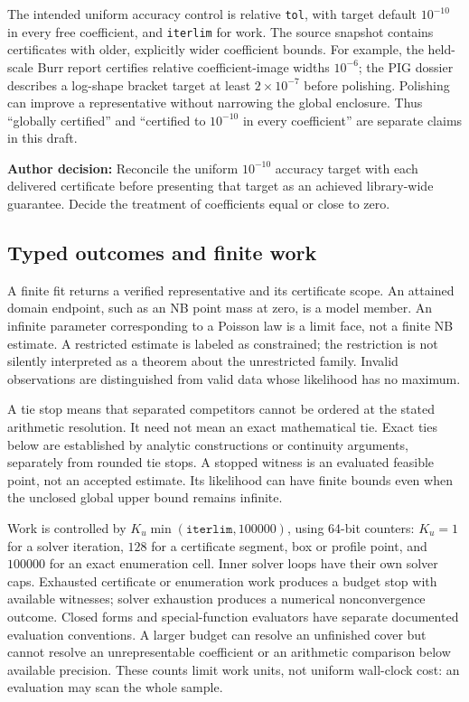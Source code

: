 \documentclass[12pt]{article}
\theoremstyle{definition}
\theoremstyle{remark}
\newcommand{\todo}[1]{\par\smallskip\noindent\textcolor{red!65!black}{\textbf{Author decision:} #1}\par\smallskip}
\newcommand{\code}[1]{\nolinkurl{#1}}
\begin{document}
The intended uniform accuracy control is relative \code{tol}, with target
default $10^{-10}$ in every free coefficient, and \code{iterlim} for work.
The source snapshot contains certificates with older, explicitly wider
coefficient bounds. For example, the held-scale Burr report certifies relative
coefficient-image widths $10^{-6}$; the PIG dossier describes a log-shape
bracket target at least $2\times10^{-7}$ before polishing. Polishing can
improve a representative without narrowing the global enclosure. Thus
``globally certified'' and ``certified to $10^{-10}$ in every coefficient''
are separate claims in this draft.
\todo{Reconcile the uniform $10^{-10}$ accuracy target with each delivered certificate before presenting that target as an achieved library-wide guarantee. Decide the treatment of coefficients equal or close to zero.}

\subsection{Typed outcomes and finite work}
A finite fit returns a verified representative and its certificate scope.
An attained domain endpoint, such as an NB point mass at zero, is a model
member. An infinite parameter corresponding to a Poisson law is a limit face,
not a finite NB estimate. A restricted estimate is labeled as constrained;
the restriction is not silently interpreted as a theorem about the
unrestricted family. Invalid observations are distinguished from valid data
whose likelihood has no maximum.

A tie stop means that separated competitors cannot be ordered at the stated
arithmetic resolution. It need not mean an exact mathematical tie. Exact ties
below are established by analytic constructions or continuity arguments,
separately from rounded tie stops. A stopped witness is an evaluated feasible
point, not an accepted estimate. Its likelihood can have finite bounds even
when the unclosed global upper bound remains infinite.

Work is controlled by $K_u\min(\mathtt{iterlim},100000)$, using 64-bit counters:
$K_u=1$ for a solver iteration, $128$ for a certificate segment, box or profile
point, and $100000$ for an exact enumeration cell. Inner solver loops have
their own solver caps. Exhausted certificate or enumeration work produces a
budget stop with available witnesses; solver exhaustion produces a numerical
nonconvergence outcome. Closed forms and special-function evaluators have
separate documented evaluation conventions. A larger budget can resolve an
unfinished cover but cannot resolve an unrepresentable coefficient or an
arithmetic comparison below available precision. These counts limit work
units, not uniform wall-clock cost: an evaluation may scan the whole sample.
\end{document}
